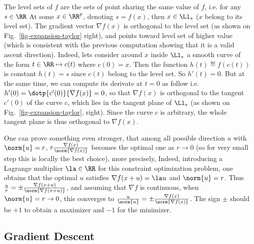\begin{rem}
	The level sets of $f$ are the sets of point sharing the same value of $f$, i.e. for any $s \in \RR$
	At some $x \in \RR^p$, denoting $s=f(x)$, then $x \in \Ll_s$ ($x$ belong to its level set). The gradient vector $\nabla f(x)$ is orthogonal to the level set (as shown on Fig.~\ref{fig-expansion-taylor} right), and points toward level set of higher value (which is consistent with the previous computation showing that it is a valid ascent direction). 
	Indeed, lets consider around $x$ inside $\Ll_s$ a smooth curve of the form $t \in \RR \mapsto c(t)$ where $c(0)=x$. 
	Then the function $h(t) \eqdef f(c(t))$ is constant $h(t)=s$  since $c(t)$ belong to the level set. So $h'(t)=0$. But at the same time, we can compute its derivate at $t=0$ as follow
	i.e. $h'(0) = \dotp{c'(0)}{\nabla f(x)}=0$, so that $\nabla f(x)$ is orthogonal to the tangent $c'(0)$ of the curve $c$, which lies in the tangent plane of $\Ll_s$  (as shown on Fig.~\ref{fig-expansion-taylor}, right).  Since the curve $c$ is arbitrary, the whole tangent plane is thus orthogonal to $\nabla f(x)$. 
\end{rem}

\begin{rem}
	One can prove something even stronger, that among all possible direction $u$ with $\norm{u}=r$, $r \frac{\nabla f(x)}{\norm{\nabla f(x)}}$ becomes the optimal one as $r \rightarrow 0$ (so for very small step this is locally the best choice), more precisely, 
Indeed, introducing a Lagrange multiplier $\la \in \RR$ for this constraint optimization problem, one obtains that the optimal $u$ satisfies $\nabla f(x+u) = \la u$ and $\norm{u}=r$. Thus $\frac{u}{r} =\pm \frac{\nabla f(x+u)}{\norm{\nabla f(x+u)}}$, and assuming that $\nabla f$ is continuous, when $\norm{u}=r \rightarrow 0$, this converges to $\frac{u}{\norm{u}} = \pm\frac{\nabla f(x)}{\norm{\nabla f(x)}}$. The sign $\pm$ should be $+1$ to obtain a maximizer and $-1$ for the minimizer.
\end{rem}


\subsection{Gradient Descent}

